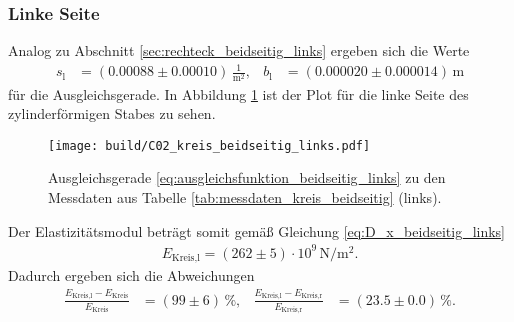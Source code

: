 \subsubsection{Linke Seite}
Analog zu Abschnitt \ref{sec:rechteck_beidseitig_links} ergeben sich die Werte
\begin{align*}
    s_\text{l} &= (\num{0.00088} \pm \num{0.00010}) \, \frac{1}{\unit{\meter^2}}, & 
    b_\text{l} &= (\num{0.000020} \pm \num{0.000014}) \, \unit{\meter}
\end{align*}
für die Ausgleichsgerade.
In Abbildung \ref{fig:plot_kreis_beidseitig_links} ist der Plot für die linke Seite des zylinderförmigen Stabes zu sehen.
%
\begin{figure}[H]
    \centering
    \texttt{[image: build/C02\_kreis\_beidseitig\_links.pdf]}
    \caption{Ausgleichsgerade \eqref{eq:ausgleichsfunktion_beidseitig_links} zu den Messdaten aus Tabelle \ref{tab:messdaten_kreis_beidseitig} (links).}
    \label{fig:plot_kreis_beidseitig_links}
\end{figure}

\noindent
Der Elastizitätsmodul beträgt somit gemäß Gleichung \eqref{eq:D_x_beidseitig_links}
\begin{align}
    E_\text{Kreis,l} = (\num{262} \pm \num{5}) \cdot 10^9 \, \unit{\newton\per\meter^2}.
\end{align}
Dadurch ergeben sich die Abweichungen
\begin{align*}
    \frac{E_\text{Kreis,l} - E_\text{Kreis}}{E_\text{Kreis}} &= (\num{99} \pm \num{6}) \, \%, &
    \frac{E_\text{Kreis,l} - E_\text{Kreis,r}}{E_\text{Kreis,r}} &= (\num{23.5} \pm \num{0.0}) \, \%.
\end{align*}
